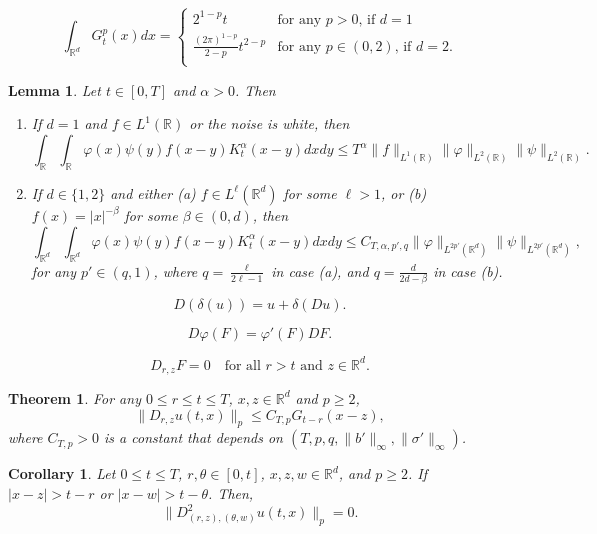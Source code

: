 \documentclass[10pt,a4paper]{amsart}
\newtheorem{lemma}{Lemma}
\newtheorem{theorem}{Theorem}
\newtheorem{corollary}{Corollary}
\def\bR{\mathbb{R}}
\begin{document}
\begin{equation}
\label{int G p}
 \int_{\bR^d} G^p_t(x) dx = 
 \begin{cases} 
  2^{1-p}t & \mbox{for any $p >0$, if $d=1$} \\
  \frac{(2\pi)^{1-p}}{2-p}t^{2-p} & \mbox{for any $p\in (0, 2)$, if $d=2$}. \\
 \end{cases}
\end{equation}

\begin{lemma} \label{fK int}
Let $ t \in [0, T]$ and $\alpha>0$. Then 
\begin{enumerate}
 \item[(i)] If $d = 1$ and $f \in L^1(\bR)$ or the noise is white, then
\[
\int_{\bR} \int_{\bR} \varphi(x)\psi (y) f(x-y) K_t^{\alpha}(x-y) dx dy  \leq T^{\alpha} \|f\|_{L^1(\bR)} \|\varphi\|_{L^{2}(\bR)}\|\psi\|_{L^{2}(\bR)}.
\]
\item[(ii)] If $d\in \{1,2\}$ and either (a) $f \in L^\ell(\bR^d)$ for some $\ell >1$, or (b) $f(x) = |x|^{-\beta}$ for some $\beta \in (0,d)$, then 
\[
\int_{\bR^d} \int_{\bR^d} \varphi(x)\psi(y) f(x-y)K_t^{\alpha}(x-y)  dx dy \leq C_{T,\alpha,p',q} \|\varphi\|_{L^{2p'}(\bR^d)}\|\psi\|_{L^{2p'}(\bR^d)},
\]
for any $p'\in (q,1)$, where $q=\frac{\ell}{2\ell-1}$ in case (a), and $q=\frac{d}{2d-\beta}$ in case (b). 
\end{enumerate}
\end{lemma}

\begin{equation}
\label{Heisenberg}
D(\delta(u))=u+\delta(Du).
\end{equation}

\begin{equation}
\label{chain}
D\varphi(F)=\varphi'(F)DF.
\end{equation}

\begin{equation}
\label{Mal-zero}
D_{r,z}F=0 \quad \mbox{for all $r>t$ and $z \in \bR^d$}.
\end{equation}

\begin{theorem}
\label{key-Du}
For any $0\leq r\leq t \leq T$, $x,z \in \bR^d$ and $p\geq 2$,
\[
\|D_{r,z}u(t,x)\|_p \leq C_{T,p} G_{t-r}(x-z),
\]
where $C_{T,p}>0$ is a constant that depends on $(T,p,q,\|b'\|_\infty,\|\sigma'\|_\infty)$.
\end{theorem}

\begin{corollary}
\label{D2u-support}
Let $0\leq t \leq T$, $r,\theta \in [0,t]$, $x,z,w \in \bR^d$, and $p \geq 2$. If $|x-z| > t-r$ or $|x-w| > t - \theta$. Then, 
\[
\|D_{(r,z),(\theta,w)}^2u(t,x)\|_p = 0. 
\]
\end{corollary}
\end{document}
